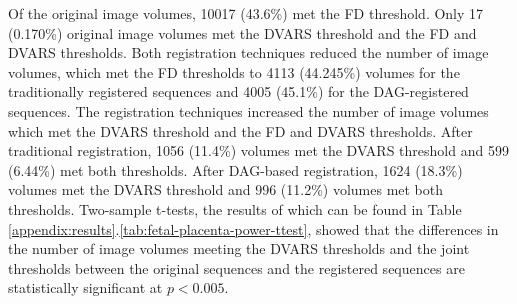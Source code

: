Of the original image volumes, 10017 (43.6\%) met the FD threshold. Only 17 (0.170\%) original image volumes met the DVARS threshold and the FD and DVARS thresholds. Both registration techniques reduced the number of image volumes, which met the FD thresholds to 4113 (44.245\%) volumes for the traditionally registered sequences and 4005 (45.1\%) for the DAG-registered sequences. The registration techniques increased the number of image volumes which met the DVARS threshold and the FD and DVARS thresholds. After traditional registration, 1056 (11.4\%) volumes met the DVARS threshold and 599 (6.44\%) met both thresholds. After DAG-based registration, 1624 (18.3\%) volumes met the DVARS threshold and 996 (11.2\%) volumes met both thresholds. Two-sample t-tests, the results of which can be found in Table \ref{appendix:results}.\ref{tab:fetal-placenta-power-ttest}, showed that the differences in the number of image volumes meeting the DVARS thresholds and the joint thresholds between the original sequences and the registered sequences are statistically significant at $p < 0.005$.

